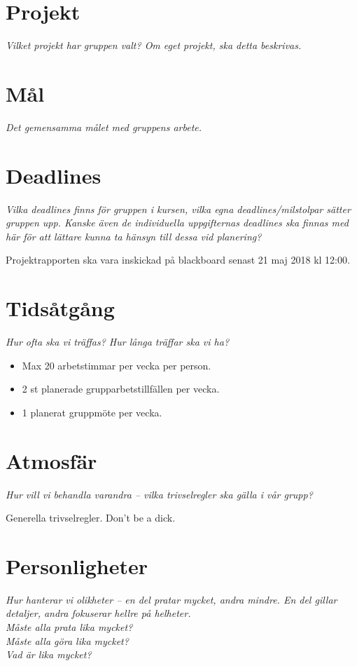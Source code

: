 
\section*{Projekt}
\textit{Vilket projekt har gruppen valt? Om eget projekt, ska detta beskrivas.}

\section*{Mål}
\textit{Det gemensamma målet med gruppens arbete.}

\section*{Deadlines}
\textit{Vilka deadlines finns för gruppen i kursen, vilka egna deadlines/milstolpar sätter gruppen upp. Kanske även de individuella uppgifternas deadlines ska finnas med här för att lättare kunna ta hänsyn till dessa vid planering?}

Projektrapporten ska vara inskickad på blackboard senast 21 maj 2018 kl 12:00.

\section*{Tidsåtgång}
\textit{Hur ofta ska vi träffas? Hur långa träffar ska vi ha?}

\begin{itemize}[noitemsep]
    \item Max 20 arbetstimmar per vecka per person.
    \item 2 st planerade grupparbetstillfällen per vecka.
    \item 1 planerat gruppmöte per vecka.
\end{itemize}

\section*{Atmosfär}
\textit{Hur vill vi behandla varandra – vilka trivselregler ska gälla i vår grupp?}

Generella trivselregler. Don't be a dick.

\section*{Personligheter}
\textit{Hur hanterar vi olikheter – en del pratar mycket, andra mindre. En del gillar detaljer, andra fokuserar hellre på helheter. \\
Måste alla prata lika mycket? \\
Måste alla göra lika mycket? \\
Vad är lika mycket?}



